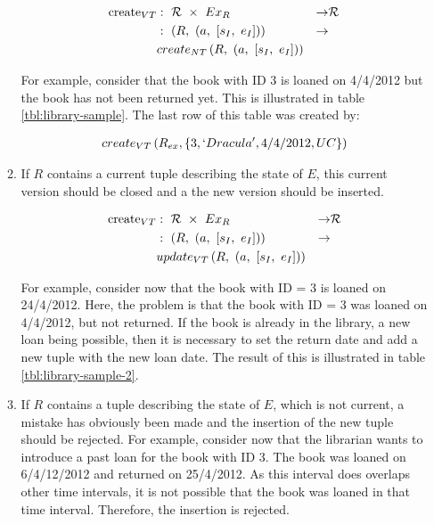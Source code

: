 \begin{enumerate}
\begin{enumerate}
\begin{align}
\text{create}_{VT} & :\ \Rel\ \times\ Ex_{R} & \rightarrow & \Rel \nonumber \\
							& :\ \left(R,\ \left(a,\ \left[s_{I},\ e_{I}\right]\right)\right) & \rightarrow \nonumber \\ 
							& create_{NT}\left(R,\ \left(a,\ \left[s_{I},\ e_{I}\right]\right)\right)
							\nonumber
\end{align}

For example, consider that the book with ID 3 is loaned on 4/4/2012 but the book has not been returned yet. This is illustrated in table \ref{tbl:library-sample}. The last row of this table was created by:

\begin{align}
create_{VT}\left(R_{ex}, \left\{3, `Dracula', 4/4/2012, UC\right\}\right) \nonumber
\end{align}


	\item If $R$ contains a current tuple describing the state of $E$, this current version should be closed and a the new version should be inserted.
	
\begin{align}
\text{create}_{VT} & :\ \Rel\ \times\ Ex_{R} & \rightarrow & \Rel \nonumber \\
							& :\ \left(R,\ \left(a,\ \left[s_{I},\ e_{I}\right]\right)\right) & \rightarrow \nonumber \\ 
							& update_{VT}\left(R,\ \left(a,\ \left[s_{I},\ e_{I}\right]\right)\right)
							\nonumber
\end{align}
	
For example, consider now that the book with ID = 3 is loaned on 24/4/2012. Here, the problem is that the book with ID = 3 was loaned on 4/4/2012, but not returned. If the book is already in the library, a new loan being possible, then it is necessary to set the return date and add a new tuple with the new loan date. The result of this is illustrated in table \ref{tbl:library-sample-2}.

	\item If $R$ contains a tuple describing the state of $E$, which is not current, a mistake has obviously been made and the insertion of the new tuple should be rejected.
For example, consider now that the librarian wants to introduce a past loan for the book with ID 3. The book was loaned on 6/4/12/2012 and returned on 25/4/2012. As this interval does overlaps other time intervals, it is not possible that the book was loaned in that time interval. Therefore, the insertion is rejected.

	\end{enumerate}

\end{enumerate}

